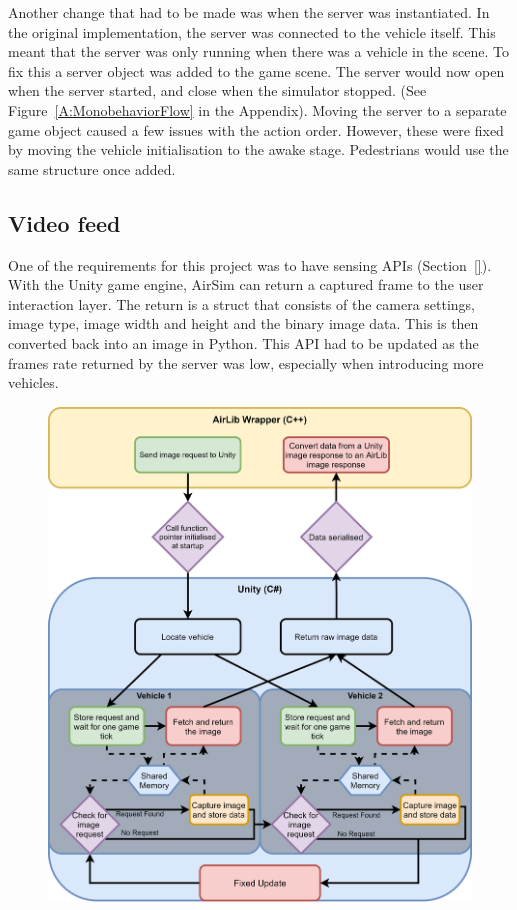 Another change that had to be made was when the server was instantiated. In the original implementation, the server was connected to the vehicle itself. This meant that the server was only running when there was a vehicle in the scene. To fix this a server object was added to the game scene. The server would now open when the server started, and close when the simulator stopped. (See Figure~\ref{A:MonobehaviorFlow} in the Appendix). Moving the server to a separate game object caused a few issues with the action order. However, these were fixed by moving the vehicle initialisation to the awake stage. Pedestrians would use the same structure once added. 


\subsection{Video feed} \label{06:VideoFeed}
One of the requirements for this project was to have sensing APIs (Section~\ref{}). With the Unity game engine, AirSim can return a captured frame to the user interaction layer. The return is a struct that consists of the camera settings, image type, image width and height and the binary image data. This is then converted back into an image in Python. This API had to be updated as the frames rate returned by the server was low, especially when introducing more vehicles. 

\begin{figure}[h]
    \centering
    \includegraphics[width=1.0\textwidth]{06_Implementation/00_AirSim/Diagrams/imagecapture.png}
    \caption{} \label{06:imageCapture}
\end{figure}

